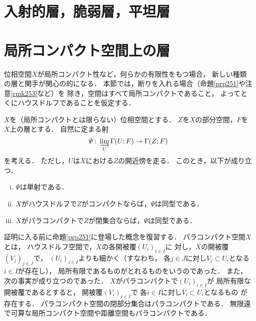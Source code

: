 






\clearpage
\section{入射的層，脆弱層，平坦層}
\section{局所コンパクト空間上の層}
位相空間\(X\)が局所コンパクト性など，何らかの有限性をもつ場合，
新しい種類の層と関手が関心の的になる．
本節では，断りを入れる場合（命題\ref{prp251}や注意\ref{rmk253}など）を
除き，空間はすべて局所コンパクトであること，
よってとくにハウスドルフであることを仮定する．

\begin{PRP}\label{prp251}
    \(X\)を（局所コンパクトとは限らない）位相空間とする．
    \(Z\)を\(X\)の部分空間，\(F\)を\(X\)上の層とする．
    自然に定まる射
    \[
        \varPsi\colon\indlim[U]\Gamma(U;F)\to \Gamma(Z;F)
    \]
    を考える．
    ただし，\(U\)は\(X\)における\(Z\)の開近傍を走る．
    このとき，以下が成り立つ．
    \begin{enumerate}[(i)]
        \item \(\varPsi\)は単射である．
        \item \(X\)がハウスドルフで\(Z\)がコンパクトならば，\(\varPsi\)は同型である．
        \item \(X\)がパラコンパクトで\(Z\)が閉集合ならば，\(\varPsi\)は同型である．
    \end{enumerate}
\end{PRP}
証明に入る前に命題\ref{prp251}に登場した概念を復習する．
パラコンパクト空間\(X\)とは，
ハウスドルフ空間で，\(X\)の各開被覆\(\left(U_i\right)_{i\in I}\)に
対し，\(X\)の開被覆\(\left(V_j\right)_{j\in J}\)で，
\(\left(U_i\right)_{i\in I}\)よりも細かく（すなわち，
各\(j\in J\)に対し\(V_j\subset U_i\)となる\(i\in I\)が存在し），
局所有限であるものがとれるものをいうのであった．
また，次の事実が成り立つのであった．
\(X\)がパラコンパクトで\(\left(U_i\right)_{i\in I}\)が
局所有限な開被覆であるとすると，
開被覆\(\left(V_i\right)_{i\in I}\)で
各\(i\in I\)に対し\(\bar{V}_i\subset U_i\)となるもの
が存在する．
パラコンパクト空間の閉部分集合はパラコンパクトである．
無限遠で可算な局所コンパクト空間や距離空間もパラコンパクトである．
